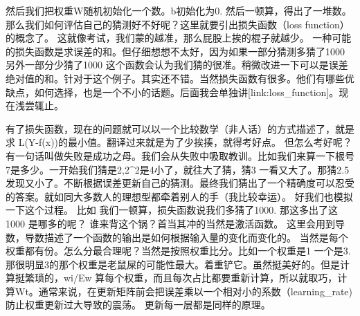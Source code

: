 然后我们把权重W随机初始化一个数。b初始化为0. 
然后一顿算，得出了一堆数。那么我们如何评估自己的猜测好不好呢？这里就要引出损失函数（loss function）的概念了。 这就像考试，我们蒙的越准，那么屁股上挨的棍子就越少。
一种可能的损失函数是求误差的和。但仔细想想不太好，因为如果一部分猜测多猜了1000 另外一部分少猜了1000 这个函数会认为我们猜的很准。稍微改进一下可以是误差绝对值的和。针对于这个例子。其实还不错。当然损失函数有很多。他们有哪些优缺点，如何选择，也是一个不小的话题。后面我会单独讲[link:loss_function]。现在浅尝辄止。

有了损失函数，现在的问题就可以以一个比较数学（非人话）的方式描述了，就是求 L(Y-f(x))的最小值。翻译过来就是为了少挨揍，就得考好点。
但怎么考好呢？ 有一句话叫做失败是成功之母。我们会从失败中吸取教训。比如我们来算一下根号7是多少。一开始我们猜是2,2^2是4小了，就往大了猜，猜3 一看又大了。那猜2.5 发现又小了。不断根据误差更新自己的猜测。最终我们猜出了一个精确度可以忍受的答案。就如同大多数人的理想型都牵着别人的手（我比较幸运）。 好我们也模拟一下这个过程。
比如 我们一顿算，损失函数说我们多猜了1000. 那这多出了这1000 是哪多的呢？ 谁来背这个锅？首当其冲的当然是激活函数。 这里会用到导数，导数描述了一个函数的输出是如何根据输入量的变化而变化的。 当然是每个权重都有份。怎么分最合理呢？当然是按照权重比分。比如一个权重是1 一个是3.那很明显3的那个权重是老鼠屎的可能性最大。着重铲它。虽然挺美好的。但是计算挺繁琐的，wi/Ew 算每个权重，而且每次占比都要重新计算，所以就取巧，计算Wt。通常来说，在更新矩阵前会把误差乘以一个相对小的系数（learning_rate) 防止权重更新过大导致的震荡。 更新每一层都是同样的原理。


